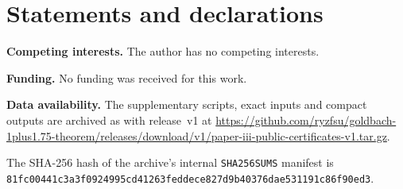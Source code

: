 \documentclass{amsart}
\theoremstyle{remark}
\theoremstyle{plain}
\numberwithin{equation}{section}
\numberwithin{table}{section}
\begin{document}
\section*{Statements and declarations}

\textbf{Competing interests.} The author has no competing interests.

\textbf{Funding.} No funding was received for this work.

\textbf{Data availability.} The supplementary scripts, exact inputs and
compact outputs are archived as
 with release~v1 at
\url{https://github.com/ryzfsu/goldbach-1plus1.75-theorem/releases/download/v1/paper-iii-public-certificates-v1.tar.gz}.
\par\noindent The SHA-256 hash of the archive's internal
\texttt{SHA256SUMS} manifest is
\texttt{81fc0044}\allowbreak{}\texttt{1c3a3f09}\allowbreak{}\texttt{24995cd4}\allowbreak{}\texttt{1263fedd}\allowbreak{}\texttt{ece827d9}\allowbreak{}\texttt{b40376da}\allowbreak{}\texttt{e531191c}\allowbreak{}\texttt{86f90ed3}.


\end{document}
